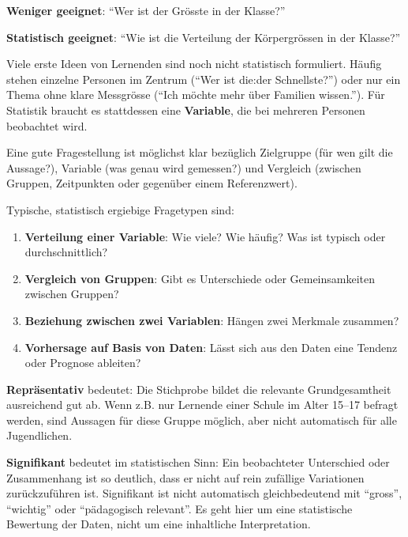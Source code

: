 \begin{myexample}
	\textbf{Weniger geeignet}: ``Wer ist der Grösste in der Klasse?''

	\textbf{Statistisch geeignet}: ``Wie ist die Verteilung der Körpergrössen in der Klasse?''
\end{myexample}

\begin{myattention}
	Viele erste Ideen von Lernenden sind noch nicht statistisch formuliert. Häufig stehen einzelne Personen im Zentrum (``Wer ist die:der Schnellste?'')
	oder nur ein Thema ohne klare Messgrösse (``Ich möchte mehr über Familien wissen.'').
	Für Statistik braucht es stattdessen eine \textbf{Variable}, die bei mehreren Personen beobachtet wird.
\end{myattention}

\begin{myremark}
	Eine gute Fragestellung ist möglichst klar bezüglich Zielgruppe (für wen gilt die Aussage?),
	Variable (was genau wird gemessen?) und Vergleich (zwischen Gruppen, Zeitpunkten oder gegenüber einem Referenzwert).

	Typische, statistisch ergiebige Fragetypen sind:
	\begin{enumerate}
		\item \textbf{Verteilung einer Variable}: Wie viele? Wie häufig? Was ist typisch oder durchschnittlich?
		\item \textbf{Vergleich von Gruppen}: Gibt es Unterschiede oder Gemeinsamkeiten zwischen Gruppen?
		\item \textbf{Beziehung zwischen zwei Variablen}: Hängen zwei Merkmale zusammen?
		\item \textbf{Vorhersage auf Basis von Daten}: Lässt sich aus den Daten eine Tendenz oder Prognose ableiten?
	\end{enumerate}
\end{myremark}

\begin{mydefinition}
	\textbf{Repräsentativ} bedeutet: Die Stichprobe bildet die relevante Grundgesamtheit ausreichend gut ab.
	Wenn z.B. nur Lernende einer Schule im Alter 15--17 befragt werden, sind Aussagen für diese Gruppe möglich, aber nicht automatisch für alle Jugendlichen.
\end{mydefinition}

\begin{mydefinition}
	\textbf{Signifikant} bedeutet im statistischen Sinn: Ein beobachteter Unterschied oder Zusammenhang ist so deutlich, dass er nicht auf rein zufällige Variationen zurückzuführen ist.
	Signifikant ist nicht automatisch gleichbedeutend mit ``gross'', ``wichtig'' oder ``pädagogisch relevant''. Es geht hier um eine statistische Bewertung der Daten, nicht um eine inhaltliche Interpretation.
\end{mydefinition}

